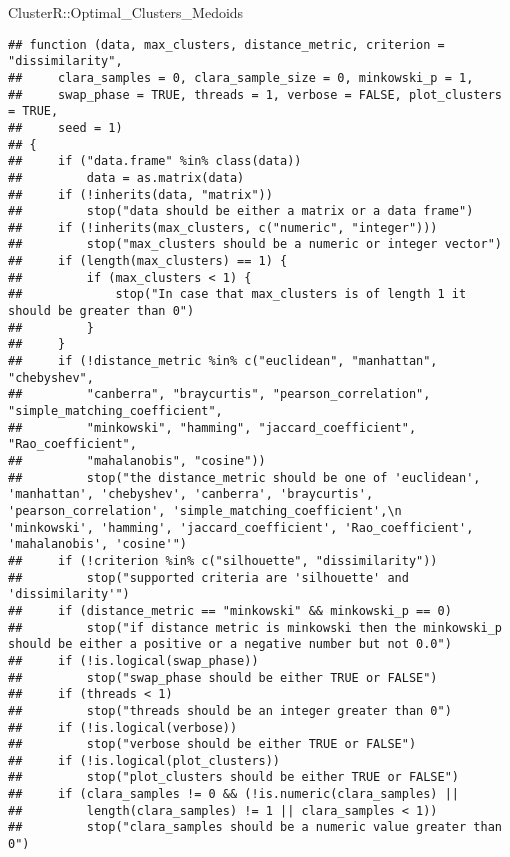 \documentclass[
]{article}
\newenvironment{Shaded}{\begin{snugshade}}{\end{snugshade}}
\newcommand{\NormalTok}[1]{#1}
\newcommand{\SpecialCharTok}[1]{\textcolor[rgb]{0.00,0.00,0.00}{#1}}
\begin{document}
\begin{Shaded}
\begin{Highlighting}[]
\NormalTok{ClusterR}\SpecialCharTok{::}\NormalTok{Optimal\_Clusters\_Medoids}
\end{Highlighting}
\end{Shaded}

\begin{verbatim}
## function (data, max_clusters, distance_metric, criterion = "dissimilarity", 
##     clara_samples = 0, clara_sample_size = 0, minkowski_p = 1, 
##     swap_phase = TRUE, threads = 1, verbose = FALSE, plot_clusters = TRUE, 
##     seed = 1) 
## {
##     if ("data.frame" %in% class(data)) 
##         data = as.matrix(data)
##     if (!inherits(data, "matrix")) 
##         stop("data should be either a matrix or a data frame")
##     if (!inherits(max_clusters, c("numeric", "integer"))) 
##         stop("max_clusters should be a numeric or integer vector")
##     if (length(max_clusters) == 1) {
##         if (max_clusters < 1) {
##             stop("In case that max_clusters is of length 1 it should be greater than 0")
##         }
##     }
##     if (!distance_metric %in% c("euclidean", "manhattan", "chebyshev", 
##         "canberra", "braycurtis", "pearson_correlation", "simple_matching_coefficient", 
##         "minkowski", "hamming", "jaccard_coefficient", "Rao_coefficient", 
##         "mahalanobis", "cosine")) 
##         stop("the distance_metric should be one of 'euclidean', 'manhattan', 'chebyshev', 'canberra', 'braycurtis', 'pearson_correlation', 'simple_matching_coefficient',\n         'minkowski', 'hamming', 'jaccard_coefficient', 'Rao_coefficient', 'mahalanobis', 'cosine'")
##     if (!criterion %in% c("silhouette", "dissimilarity")) 
##         stop("supported criteria are 'silhouette' and 'dissimilarity'")
##     if (distance_metric == "minkowski" && minkowski_p == 0) 
##         stop("if distance metric is minkowski then the minkowski_p should be either a positive or a negative number but not 0.0")
##     if (!is.logical(swap_phase)) 
##         stop("swap_phase should be either TRUE or FALSE")
##     if (threads < 1) 
##         stop("threads should be an integer greater than 0")
##     if (!is.logical(verbose)) 
##         stop("verbose should be either TRUE or FALSE")
##     if (!is.logical(plot_clusters)) 
##         stop("plot_clusters should be either TRUE or FALSE")
##     if (clara_samples != 0 && (!is.numeric(clara_samples) || 
##         length(clara_samples) != 1 || clara_samples < 1)) 
##         stop("clara_samples should be a numeric value greater than 0")

\end{verbatim}
\end{document}
